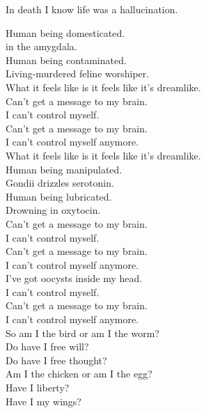 In death I know life was a hallucination. \\




Human being domesticated. \\
 in the amygdala. \\
Human being contaminated. \\
Living-murdered feline worshiper. \\

What it feels like is it feels like it's dreamlike. \\

Can't get a message to my brain. \\
I can't control myself. \\
Can't get a message to my brain. \\
I can't control myself anymore. \\

What it feels like is it feels like it's dreamlike. \\

Human being manipulated. \\
Gondii drizzles serotonin. \\
Human being lubricated. \\
Drowning in oxytocin. \\

Can't get a message to my brain. \\
I can't control myself. \\
Can't get a message to my brain. \\
I can't control myself anymore. \\
I've got oocysts inside my head. \\
I can't control myself. \\
Can't get a message to my brain. \\
I can't control myself anymore. \\

So am I the bird or am I the worm? \\
Do have I free will? \\
Do have I free thought? \\

Am I the chicken or am I the egg? \\
Have I liberty? \\
Have I my wings? \\

